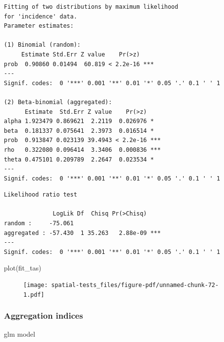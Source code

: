 \documentclass[
  letterpaper,
]{book}
\newenvironment{Shaded}{\begin{snugshade}}{\end{snugshade}}
\newcommand{\FunctionTok}[1]{\textcolor[rgb]{0.28,0.35,0.67}{#1}}
\newcommand{\NormalTok}[1]{\textcolor[rgb]{0.00,0.23,0.31}{#1}}
\newcommand{\SpecialCharTok}[1]{\textcolor[rgb]{0.37,0.37,0.37}{#1}}
\begin{document}
\begin{verbatim}
Fitting of two distributions by maximum likelihood
for 'incidence' data.
Parameter estimates:

(1) Binomial (random):
     Estimate Std.Err Z value    Pr(>z)    
prob  0.90860 0.01494  60.819 < 2.2e-16 ***
---
Signif. codes:  0 '***' 0.001 '**' 0.01 '*' 0.05 '.' 0.1 ' ' 1

(2) Beta-binomial (aggregated):
      Estimate  Std.Err Z value    Pr(>z)    
alpha 1.923479 0.869621  2.2119  0.026976 *  
beta  0.181337 0.075641  2.3973  0.016514 *  
prob  0.913847 0.023139 39.4943 < 2.2e-16 ***
rho   0.322080 0.096414  3.3406  0.000836 ***
theta 0.475101 0.209789  2.2647  0.023534 *  
---
Signif. codes:  0 '***' 0.001 '**' 0.01 '*' 0.05 '.' 0.1 ' ' 1
\end{verbatim}

\begin{Shaded}
\end{Shaded}

\begin{verbatim}
Likelihood ratio test

              LogLik Df  Chisq Pr(>Chisq)    
random :     -75.061                         
aggregated : -57.430  1 35.263   2.88e-09 ***
---
Signif. codes:  0 '***' 0.001 '**' 0.01 '*' 0.05 '.' 0.1 ' ' 1
\end{verbatim}

\begin{Shaded}
\begin{Highlighting}[]
\FunctionTok{plot}\NormalTok{(fit\_tas)}
\end{Highlighting}
\end{Shaded}

\begin{figure}[H]

\texttt{[image: spatial-tests\_files/figure-pdf/unnamed-chunk-72-1.pdf]} \hfill{}

\end{figure}

\hypertarget{aggregation-indices-1}{%
\subsubsection{Aggregation indices}\label{aggregation-indices-1}}

glm model
\end{document}
